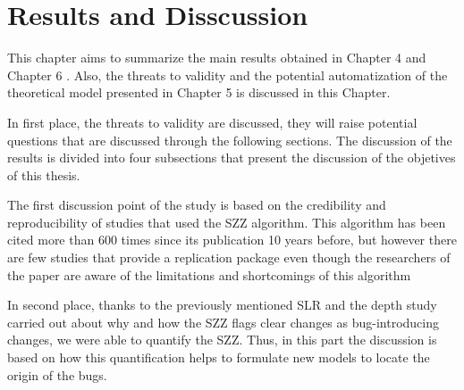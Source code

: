\documentclass[a4paper, 12pt]{book}
\begin{document}

\vspace{0.2cm}
\vspace{0.1cm}



\cleardoublepage
\chapter{Results and Disscussion}
\label{chap:discussion}

This chapter aims to summarize the main results obtained in Chapter 4 and Chapter 6 . Also, the threats to validity and the potential automatization of the theoretical model presented in Chapter 5 is discussed in this Chapter. 

In first place, the threats to validity are discussed, they will raise potential questions that are discussed through the following sections. The discussion of the results is divided into four subsections that present the discussion of  the objetives of this thesis.

The first discussion point of the study is based on the credibility and reproducibility of studies that used the SZZ algorithm. This algorithm has been cited more than 600 times since its publication 10 years before, but however there are few studies that provide a replication package even though the researchers of the paper are aware of the limitations and shortcomings of this algorithm

In second place, thanks to the previously mentioned SLR and the depth study carried out about why and how the SZZ flags clear changes as bug-introducing changes, we were able to quantify the SZZ. Thus, in this part the discussion is based on how this quantification helps to formulate new models to locate the origin of the bugs.
\end{document}

